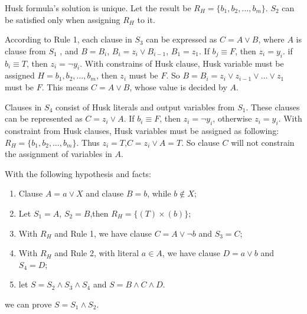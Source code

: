 \documentclass[runningheads,a4paper]{llncs}
\begin{document}
Husk formula's solution is unique.
Let the result be $R_H=\{b_1,b_2,\dots,b_m\}$.
$S_2$ can be satisfied only when assigning $R_H$ to it.

According to Rule 1, 
each clause in $S_3$ can be expressed as $C=A\vee B$,
where $A$ is clause from $S_1$ , 
and $B=B_i$, 
$B_i=z_i\vee B_{i-1}$, $B_1= z_1$.
If $b_j\equiv F$, 
then $z_i =y_i$.
if $b_i\equiv T$, 
then $z_i = \neg y_i$.
With constrains of Husk clause, 
Husk variable must be assigned $H={b_1,b_2,\dots,b_m}$, 
then $z_i$ must be $F$. 
So $B=B_i=z_i\vee z_{i-1}\vee\dots\vee z_1$ must be $F$. 
This means $C=A\vee B$,
whose value is decided by $A$. 


% 
% 
% 
% 
% 
% 
% 
% 
% 
% 
% 
%
% 
Clauses in $S_4$ consist of Husk literals and output variables from $S_1$.
These clauses can be represented as $C= z_i\vee A$. 
If $b_i\equiv F$,
then $z_i= \neg y_i$,
otherwise $z_i =y_i$.
With constraint from Husk clauses, 
Husk variables  must be assigned as following: 
$R_H=\{b_1,b_2,\dots,b_m\}$.
Thus $z_i=T$,$C=z_i\vee A=T$.
So clause $C$ will not constrain the assignment of variables in $A$.


\begin{theorem}
With the following hypothesis and facts: 
\begin{enumerate}
\item Clause $A=a\vee X$ and clause $B=b$, while $b\notin X$;
\item Let $S_1=A$, $S_2=B$,then $R_H=\{(T)\times(b)\}$;
\item With $R_H$ and Rule 1, 
we have clause $C=A\vee \neg b$ and $S_3=C$;
\item With $R_H$ and Rule 2, 
with literal $a\in A$, 
we have clause $D=a\vee b$ and $S_4=D$;
\item let $S=S_2 \wedge S_3\wedge S_4$ and $S=B\wedge C\wedge D$.
\end{enumerate}
we can prove $S=S_1\wedge S_2$.
\end{theorem}
\end{document}
